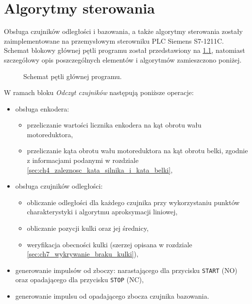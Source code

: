 \chapter{Algorytmy sterowania}
\label{cha:ch7_algorytmy_sterowania}

Obsługa czujników odległości i bazowania, a także algorytmy sterowania zostały zaimplementowane na przemysłowym sterowniku PLC Siemens S7-1211C. Schemat blokowy głównej pętli programu został przedstawiony na \cref{fig:schemat_petla_glowna_PLC}, natomiast szczegółowy opis poszczególnych elementów i algorytmów zamieszczono poniżej.

\begin{figure}[ht]
    \centering
    
    
    \caption{Schemat pętli głównej programu.}
    \label{fig:schemat_petla_glowna_PLC}
\end{figure}

W ramach bloku \textit{Odczyt czujników} następują poniższe operacje:
\begin{itemize}
    \item obsługa enkodera:
    \begin{itemize}
        \item przeliczanie wartości licznika enkodera na kąt obrotu wału motoreduktora,
        \item przeliczanie kąta obrotu wału motoreduktora na kąt obrotu belki, zgodnie z informacjami podanymi w rozdziale \ref{sec:ch4_zaleznosc_kata_silnika_i_kata_belki},
    \end{itemize}
    \item obsługa czujników odległości:
    \begin{itemize}
        \item obliczanie odległości dla każdego czujnika przy wykorzystaniu punktów charakterystyki i algorytmu aproksymacji liniowej,
        \item obliczanie pozycji kulki oraz jej średnicy,
        \item weryfikacja obecności kulki (szerzej opisana w rozdziale \ref{sec:ch7_wykrywanie_braku_kulki}),
    \end{itemize}
    \item generowanie impulsów od zboczy: narastającego dla przycisku \texttt{START} (NO) oraz opadającego dla przycisku \texttt{STOP} (NC),
    \item generowanie impulsu od opadającego zbocza czujnika bazowania.
\end{itemize}

